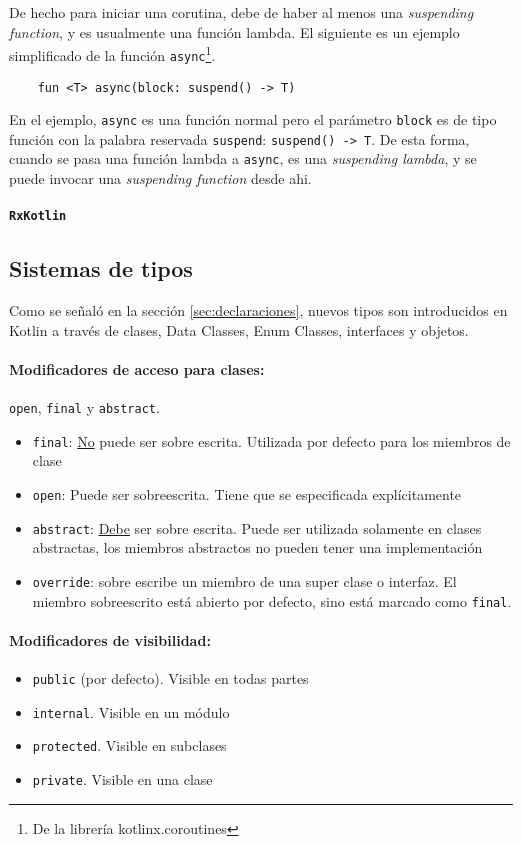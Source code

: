 De hecho para iniciar una corutina, debe de haber al menos una \emph{suspending function}, y es usualmente una función lambda. El siguiente es un ejemplo simplificado de la función \texttt{async}\footnote{De la librería kotlinx.coroutines}.
\begin{verbatim}
    fun <T> async(block: suspend() -> T)
\end{verbatim}
En el ejemplo, \texttt{async} es una función normal pero el parámetro \texttt{block} es de tipo función con la palabra reservada \texttt{suspend}: \texttt{suspend() -> T}. De esta forma, cuando se pasa una función lambda a \texttt{async}, es una \emph{suspending lambda}, y se puede invocar una \emph{suspending function} desde ahi.

\paragraph{\texttt{RxKotlin}}

\subsection{Sistemas de tipos}
Como se señaló en la sección \ref{sec:declaraciones}, nuevos tipos son introducidos en Kotlin a través de clases, Data Classes, Enum Classes, interfaces y objetos. 

\paragraph{Modificadores de acceso para clases:} \texttt{open}, \texttt{final} y \texttt{abstract}. 
\begin{itemize}
    \item \texttt{final}: \underline{No} puede ser sobre escrita. Utilizada por defecto para los miembros de clase
    \item \texttt{open}: Puede ser sobreescrita. Tiene que se especificada explícitamente
    \item \texttt{abstract}: \underline{Debe} ser sobre escrita. Puede ser utilizada solamente en clases abstractas, los miembros abstractos no pueden tener una implementación
    \item \texttt{override}: sobre escribe un miembro de una super clase o interfaz. El miembro sobreescrito está abierto por defecto, sino está marcado como \texttt{final}. 
\end{itemize}

\paragraph{Modificadores de visibilidad:}
\begin{itemize}
    \item \texttt{public} (por defecto). Visible en todas partes
    \item \texttt{internal}. Visible en un módulo
    \item \texttt{protected}. Visible en subclases
    \item \texttt{private}. Visible en una clase
\end{itemize}

